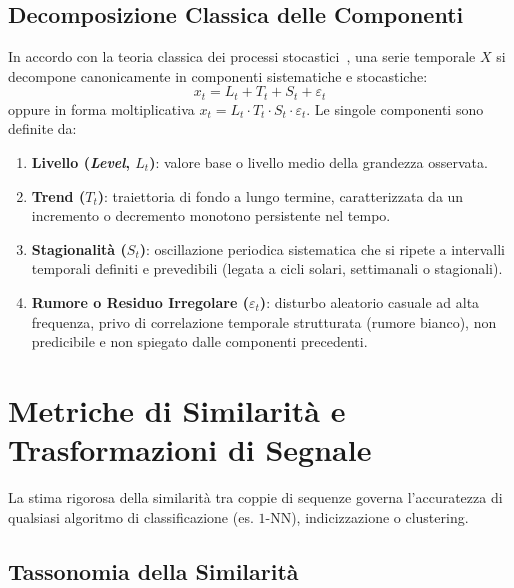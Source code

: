 \FloatBarrier
\subsection{Decomposizione Classica delle Componenti}
\label{subsec:ts-decomposition}

In accordo con la teoria classica dei processi stocastici~\cite{shumway2017, hyndman2018}, una serie temporale $X$ si decompone canonicamente in componenti sistematiche e stocastiche:
\begin{equation}
\label{eq:ts-additive-decomposition}
x_t = L_t + T_t + S_t + \varepsilon_t
\end{equation}
oppure in forma moltiplicativa $x_t = L_t \cdot T_t \cdot S_t \cdot \varepsilon_t$. Le singole componenti sono definite da:
\begin{enumerate}
    \item \textbf{Livello (\textit{Level}, $L_t$)}: valore base o livello medio della grandezza osservata.
    \item \textbf{Trend ($T_t$)}: traiettoria di fondo a lungo termine, caratterizzata da un incremento o decremento monotono persistente nel tempo.
    \item \textbf{Stagionalit\`a ($S_t$)}: oscillazione periodica sistematica che si ripete a intervalli temporali definiti e prevedibili (legata a cicli solari, settimanali o stagionali).
    \item \textbf{Rumore o Residuo Irregolare ($\varepsilon_t$)}: disturbo aleatorio casuale ad alta frequenza, privo di correlazione temporale strutturata (rumore bianco), non predicibile e non spiegato dalle componenti precedenti.
\end{enumerate}

\FloatBarrier
\section{Metriche di Similarit\`a e Trasformazioni di Segnale}
\label{sec:ts-similarity-metrics-transformations}

La stima rigorosa della similarit\`a tra coppie di sequenze governa l'accuratezza di qualsiasi algoritmo di classificazione (es. $1$-NN), indicizzazione o clustering. 

\FloatBarrier
\subsection{Tassonomia della Similarit\`a}
\label{subsec:ts-similarity-taxonomy}

